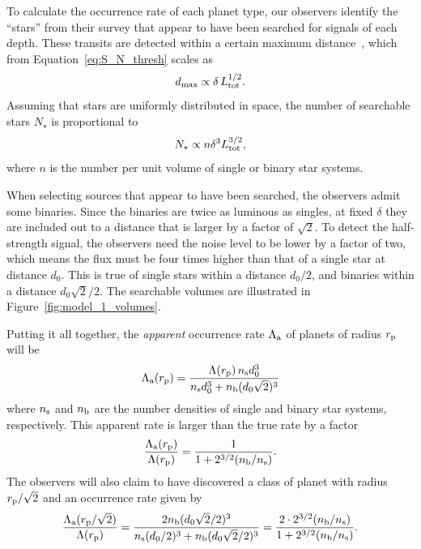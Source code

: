 \documentclass[12pt,modern]{aastex61}
\renewcommand{\a}{_{\rm a}}
\newcommand{\s}{_{\rm s}}
\newcommand{\p}{_{\rm p}}
\renewcommand{\b}{_{\rm b}}
\begin{document}
To calculate the occurrence rate of each planet type, our observers
identify the ``stars'' from their survey that appear to have been
searched for signals of each depth.  These transits are detected
within a certain maximum
distance~\citep[see][]{pepper_using_2003,pepper_searching_2005}, which
from Equation~\ref{eq:S_N_thresh} scales as
\begin{equation}
  d_{\rm max} \propto \delta \, L_{\rm tot}^{1/2}.
  \label{eq:dmax}
\end{equation}
Assuming that stars are uniformly distributed in space, the number of
searchable stars $N_\star$ is proportional to
\begin{equation}
    N_\star \propto n \delta^3 L_{\rm tot}^{3/2},
\label{eq:N_searchable_prop}
\end{equation}
where $n$ is the number per unit volume of single or binary star
systems. 

When selecting sources that appear to have been searched, the
observers admit some binaries.  Since the binaries are twice as
luminous as singles, at fixed $\delta$ they are included out to a
distance that is larger by a factor of $\sqrt{2}$.  To detect the
half-strength signal, the observers need the noise level to be lower
by a factor of two, which means the flux must be four times higher
than that of a single star at distance $d_0$.  This is true of single
stars within a distance $d_0/2$, and binaries within a distance
$d_0\sqrt{2}/2$.  The searchable volumes are illustrated in
Figure~\ref{fig:model_1_volumes}.

Putting it all together, the {\it apparent} occurrence rate
$\Lambda\a$ of planets of radius $r\p$ will be
\begin{equation}
    \Lambda\a(r\p) = 
        \frac{\Lambda(r\p) \, n\s d_0^3}
        {n\s d_0^3 + n\b (d_0\sqrt{2})^3}
    \label{eq:rate_at_rp}
\end{equation}
where $n\s$ and $n\b$ are the number densities of single and binary
star systems, respectively.  This apparent rate is larger than the
true rate by a factor
\begin{equation}
    \frac{\Lambda\a(r\p)}{\Lambda(r\p)} = 
        \frac{1}{1 + 2^{3/2}(n\b/n\s)}.
    \label{eq:correction_rp}
\end{equation}
The observers will also claim to have discovered a class of planet
with radius $r\p/\sqrt{2}$ and an occurrence rate given by
\begin{equation}
    \frac{\Lambda\a(r\p/\sqrt{2})}{\Lambda(r\p)}
    =
    \frac{2n\b (d_0\sqrt{2}/2)^3}
      {n\s (d_0/2)^3 + n\b (d_0\sqrt{2}/2)^3}
    =
    \frac{2\cdot2^{3/2}(n\b/n\s)}{1 + 2^{3/2}
    (n\b/n\s)}.
    \label{eq:correction_diluted_rp}
\end{equation}
\end{document}
